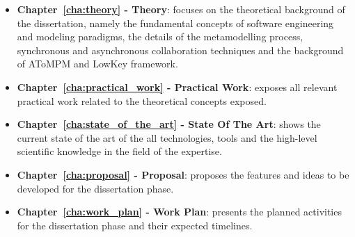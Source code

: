 \begin{itemize}
    

    \item \textbf{Chapter~\ref{cha:theory} - Theory}: focuses on the theoretical background of the dissertation, namely the fundamental concepts of software engineering and modeling paradigms, the details of the metamodelling process, synchronous and asynchronous collaboration techniques and the background of AToMPM and LowKey framework.
    \item \textbf{Chapter~\ref{cha:practical_work} - Practical Work}: exposes all relevant practical work related to the theoretical concepts exposed.
    \item \textbf{Chapter~\ref{cha:state_of_the_art} - State Of The Art}: shows the current state of the art of the all technologies, tools and the high-level scientific knowledge in the field of the expertise.
    \item \textbf{Chapter~\ref{cha:proposal} - Proposal}: proposes the features and ideas to be developed for the dissertation phase.
    \item \textbf{Chapter~\ref{cha:work_plan} - Work Plan}: presents the planned activities for the dissertation phase and their expected timelines.
 \end{itemize}
